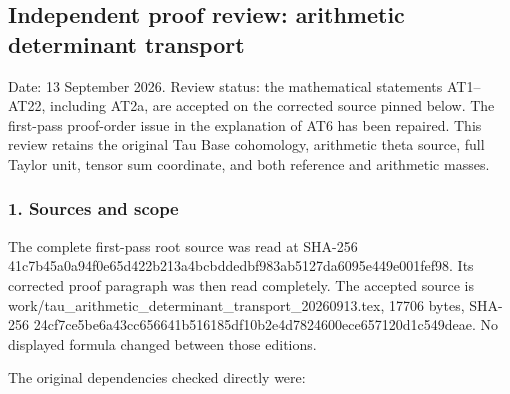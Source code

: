 \subsection{Independent proof review: arithmetic determinant transport}\label{endpoint-determinant_review--independent-proof-review-arithmetic-determinant-transport}

Date: 13 September 2026. Review status: the mathematical statements AT1--AT22, including AT2a, are accepted on the corrected source pinned below. The first-pass proof-order issue in the explanation of AT6 has been repaired. This review retains the original Tau Base cohomology, arithmetic theta source, full Taylor unit, tensor sum coordinate, and both reference and arithmetic masses.

\subsubsection{1. Sources and scope}\label{endpoint-determinant_review--sources-and-scope}

The complete first-pass root source was read at SHA-256 41c7b45a0a94f0e65d422b213a4bcbddedbf983ab5127da6095e449e001fef98. Its corrected proof paragraph was then read completely. The accepted source is work/tau\_arithmetic\_determinant\_transport\_20260913.tex, 17706 bytes, SHA-256 24cf7ce5be6a43cc656641b516185df10b2e4d7824600ece657120d1c549deae. No displayed formula changed between those editions.

The original dependencies checked directly were:

